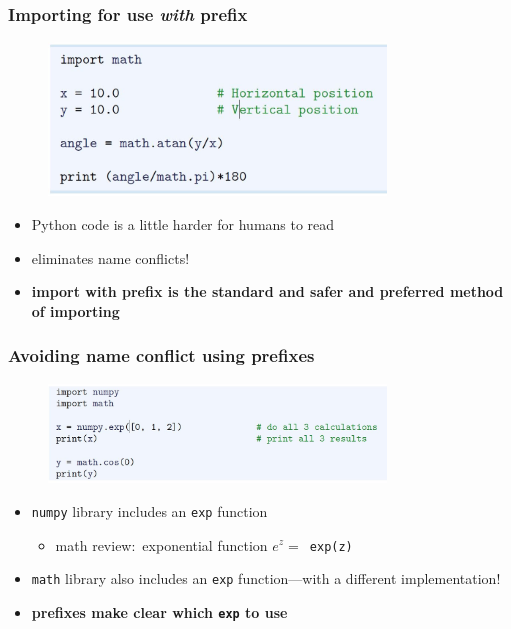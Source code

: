 \documentclass[14pt]{beamer}
\newcommand\red[1]{{\color{red} #1}}
\newcommand\green[1]{{\color{green} #1}}
\newcommand{\cmark}{\ding{51}}%
\newcommand{\xmark}{\ding{55}}%
\begin{document}
\begin{frame}[fragile]
\frametitle{Importing for use \emph{with} prefix}

\begin{figure}[ht]
	\centering
	\includegraphics[width=0.8\textwidth]{figures/LLp14}
\end{figure}
\begin{itemize}
	\item[\red{\xmark}] Python code is a little harder for humans to read
	\item[\green{\cmark}\green{\cmark}] eliminates name conflicts!
	\item \textbf{import with prefix is the standard and safer and preferred method of importing}
\end{itemize}

\end{frame}


\begin{frame}[fragile]
\frametitle{Avoiding name conflict using prefixes}

\begin{figure}[ht]
	\centering
	\includegraphics[width=0.8\textwidth]{figures/LLp17}
\end{figure}
\begin{itemize}
	\item \texttt{numpy} library includes an \texttt{exp} function
	\begin{itemize}
		\item math review:~exponential function $e^{z} =$~\texttt{exp(z)}
	\end{itemize}
	\item \texttt{math} library also includes an \texttt{exp} function---with a different implementation!
	\item[\green{\cmark}] \textbf{prefixes make clear which \texttt{exp} to use}
\end{itemize}

\end{frame}
\end{document}
